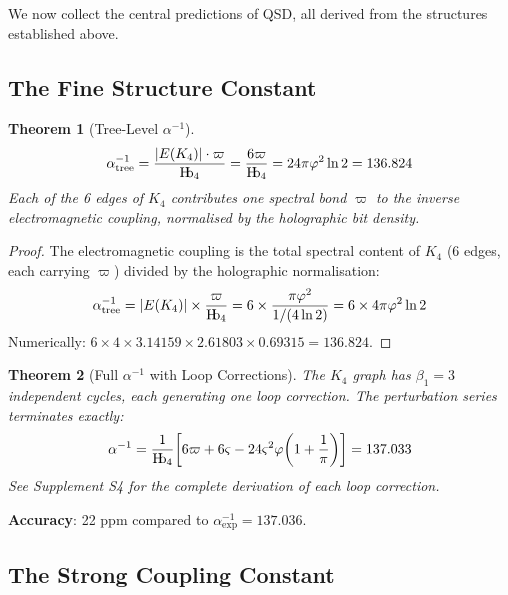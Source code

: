 \documentclass[11pt,a4paper]{article}
\newtheorem{theorem}{Theorem}[section]
\theoremstyle{definition}
\newcommand{\Hb}{\textnormal{H\kern-0.3em b}}
\newcommand{\Hbfour}{\Hb_4}
\newcommand{\gs}{\varsigma}
\newcommand{\specbond}{\varpi}
\begin{document}
We now collect the central predictions of QSD, all derived from the structures established above.

\subsection{The Fine Structure Constant}

\begin{theorem}[Tree-Level $\alpha^{-1}$]
\label{S1:thm:alpha_tree}
\begin{equation}
\alpha^{-1}_{\mathrm{tree}} = \frac{|E(K_4)| \cdot \specbond}{\Hbfour} = \frac{6\specbond}{\Hbfour} = 24\pi\varphi^2\ln 2 = 136.824
\label{S1:eq:alpha_tree}
\end{equation}
Each of the 6 edges of $K_4$ contributes one spectral bond $\specbond$ to the inverse electromagnetic coupling, normalised by the holographic bit density.
\end{theorem}

\begin{proof}
The electromagnetic coupling is the total spectral content of $K_4$ (6 edges, each carrying $\specbond$) divided by the holographic normalisation:
\begin{equation}
\alpha^{-1}_{\mathrm{tree}} = |E(K_4)| \times \frac{\specbond}{\Hbfour} = 6 \times \frac{\pi\varphi^2}{1/(4\ln 2)} = 6 \times 4\pi\varphi^2\ln 2
\end{equation}
Numerically: $6 \times 4 \times 3.14159 \times 2.61803 \times 0.69315 = 136.824$.
\end{proof}

\begin{theorem}[Full $\alpha^{-1}$ with Loop Corrections]
\label{S1:thm:alpha_full}
The $K_4$ graph has $\beta_1 = 3$ independent cycles, each generating one loop correction. The perturbation series terminates exactly:
\begin{equation}
\alpha^{-1} = \frac{1}{\Hbfour}\!\left[6\specbond + 6\gs - 24\gs^2\varphi\!\left(1 + \frac{1}{\pi}\right)\right] = 137.033
\label{S1:eq:alpha_full}
\end{equation}
See Supplement S4 \cite{Hubka2026QSDsupp} for the complete derivation of each loop correction.
\end{theorem}

\textbf{Accuracy}: 22 ppm compared to $\alpha^{-1}_{\mathrm{exp}} = 137.036$.

\subsection{The Strong Coupling Constant}
\end{document}
